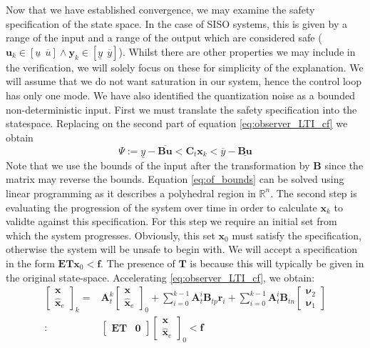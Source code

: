 \documentclass[twocolumn]{autart}    %
\newcommand{\mat}[1]{\boldsymbol{#1}}
\renewcommand{\vec}[1]{\boldsymbol{#1}}
\begin{document}
Now that we have established convergence, we may examine the safety
specification of the state space.  In the case of SISO systems, this is
given by a range of the input and a range of the output which are considered
safe ($\vec{u}_k \in [\underline{u}\ \ \overline{u}] \wedge \vec{y}_k \in
[\underline{y}\ \ \overline{y}]$).  Whilst there are other properties we may
include in the verification, we will solely focus on these for simplicity of
the explanation.  We will assume that we do not want saturation in our
system, hence the control loop has only one mode.  We have also identified
the quantization noise as a bounded non-deterministic input.  First we must
translate the safety specification into the statespace.  Replacing on the
second part of equation \eqref{eq:observer_LTI_cf} we obtain
%
\begin{equation}
\Psi := \underline{y}-\overline{\mat{B}\vec{u}}<\mat{C}_t\vec{x}_k<\overline{y}-\underline{\mat{B}\vec{u}}
\label{eq:of_bounds}
\end{equation}
Note that we use the bounds of the input after the transformation by $\mat{B}$ since the matrix may reverse the bounds. Equation \eqref{eq:of_bounds} can be solved using linear programming as it describes a polyhedral region in $\mathbb{R}^n$.
The second step is evaluating the progression of the system over time in order to calculate $\vec{x}_k$ to validte against this specification. For this step we require an initial set from which the system progresses. Obviously, this set $\vec{x}_0$ must satisfy the specification, otherwise the system will be unsafe to begin with.
We will accept a specification in the form $\mat{E}\mat{T}\vec{x}_0<\mat{f}$. The presence of $\mat{T}$ is because this will typically be given in the original state-space.
Accelerating \eqref{eq:observer_LTI_cf}, we obtain:
\begin{align}
\label{eq:acc_observer_LTI_cf}
\left [\begin{array}{c}\vec{x}\\ \hat{\vec{x}}_e \end{array}\right]_k
=&\mat{A}_t^k
\left [\begin{array}{c}\vec{x}\\ \hat{\vec{x}}_e \end{array}\right]_0
+\sum_{i=0}^{k-1} \mat{A}_t^i \mat{B}_{tp} \vec{r}_i
+\sum_{i=0}^{k-1} \mat{A}_t^i \mat{B}_{tn}\left [\begin{array}{c}\vec{\nu}_2\\ \vec{\nu}_1\end{array}\right] \nonumber\\
:&\left [\begin{array}{cc}\mat{E}\mat{T}&\mat{0}\end{array}\right] \left [\begin{array}{c}\vec{x}\\ \hat{\vec{x}}_e \end{array}\right]_0<\mat{f}
\end{align}
\end{document}

